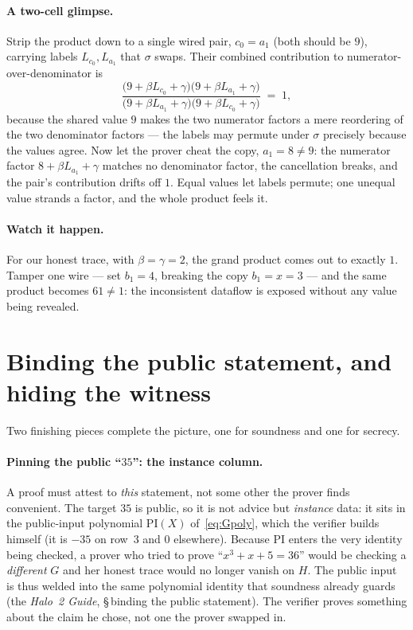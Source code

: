 \documentclass[11pt,a4paper]{article}
\theoremstyle{definition}
\begin{document}
\paragraph{A two-cell glimpse.} Strip the product down to a single wired pair,
$c_0 = a_1$ (both should be $9$), carrying labels $L_{c_0}, L_{a_1}$ that
$\sigma$ swaps. Their combined contribution to numerator-over-denominator is
\[
\frac{\bigl(9 + \beta L_{c_0} + \gamma\bigr)\bigl(9 + \beta L_{a_1} + \gamma\bigr)}
     {\bigl(9 + \beta L_{a_1} + \gamma\bigr)\bigl(9 + \beta L_{c_0} + \gamma\bigr)} \;=\; 1,
\]
because the shared value $9$ makes the two numerator factors a mere reordering
of the two denominator factors --- the labels may permute under $\sigma$
precisely because the values agree. Now let the prover cheat the copy,
$a_1 = 8 \neq 9$: the numerator factor $8 + \beta L_{a_1} + \gamma$ matches no
denominator factor, the cancellation breaks, and the pair's contribution drifts
off $1$. Equal values let labels permute; one unequal value strands a factor,
and the whole product feels it.

\paragraph{Watch it happen.} For our honest trace, with $\beta = \gamma = 2$,
the grand product comes out to exactly $1$. Tamper one wire --- set $b_1 = 4$,
breaking the copy $b_1 = x = 3$ --- and the same product becomes $61 \neq 1$:
the inconsistent dataflow is exposed without any value being revealed.

\section{Binding the public statement, and hiding the witness}\label{sec:zk}

Two finishing pieces complete the picture, one for soundness and one for
secrecy.

\paragraph{Pinning the public ``$35$'': the instance column.} A proof must
attest to \emph{this} statement, not some other the prover finds convenient.
The target $35$ is public, so it is not advice but \emph{instance} data: it
sits in the public-input polynomial $\mathrm{PI}(X)$ of~\eqref{eq:Gpoly}, which
the verifier builds himself (it is $-35$ on row~$3$ and $0$ elsewhere). Because
$\mathrm{PI}$ enters the very identity being checked, a prover who tried to
prove ``$x^3 + x + 5 = 36$'' would be checking a \emph{different} $G$ and her
honest trace would no longer vanish on $H$. The public input is thus welded
into the same polynomial identity that soundness already guards (the
\emph{Halo~2 Guide}, \S\,binding the public statement). The verifier proves
something about the claim he chose, not one the prover swapped in.
\end{document}
